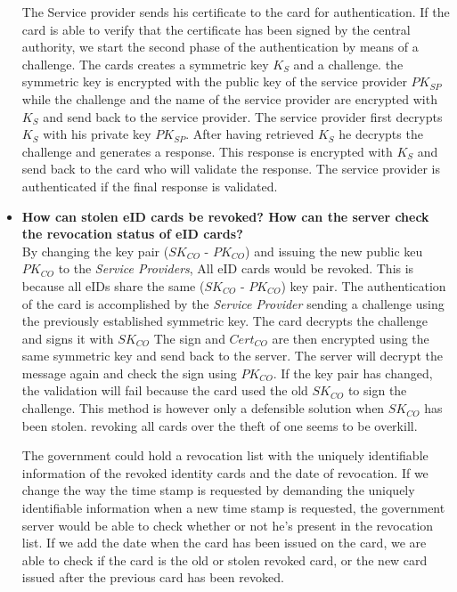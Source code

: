 \documentclass[12pt]{report}
\begin{document}
\begin{itemize}
The Service provider sends his certificate to the card for authentication. If the card is able to verify that the certificate has been signed by the central authority, we start the second phase of the authentication by means of a challenge. The cards creates a symmetric key $K_S$ and a challenge. the symmetric key is encrypted with the public key of the service provider $PK_{SP}$ while the challenge and the name of the service provider are encrypted with $K_S$  and send back to the service provider. The service provider first decrypts $K_S$ with his private key $PK_{SP}$. After having retrieved $K_S$ he decrypts the challenge and generates a response. This response is encrypted with $K_S$ and send back to the card who will validate the response. The service provider is authenticated if the final response is validated.

\item \textbf{How can stolen eID cards be revoked? How can the server check the revocation status of eID cards?}\\
By changing the key pair ($SK_{CO}$ - $PK_{CO}$) and issuing the new public keu $PK_{CO}$ to the \textit{Service Providers}, All eID cards would be revoked. This is because all eIDs share the same ($SK_{CO}$ - $PK_{CO}$) key pair. The authentication of the card is accomplished by the \textit{Service Provider} sending a challenge using the previously established symmetric key. The card decrypts the challenge and signs it with $SK_{CO}$ The sign and $Cert_{CO}$ are then encrypted using the same symmetric key and send back to the server. The server will decrypt the message again and check the sign using $PK_{CO}$. If the key pair has changed, the validation will fail because the card used the old $SK_{CO}$ to sign the challenge. This method is however only a defensible solution when $SK_{CO}$ has been stolen. revoking all cards over the theft of one seems to be overkill.

The government could hold a revocation list with the uniquely identifiable information of the revoked identity cards and the date of revocation. If we change the way the time stamp is requested by demanding the uniquely identifiable information when a new time stamp is requested, the government server would be able to check whether or not he's present in the revocation list. If we add the date when the card has been issued on the card, we are able to check if the card is the old or stolen revoked card, or the new card issued after the previous card has been revoked.


\end{itemize}
\end{document}
